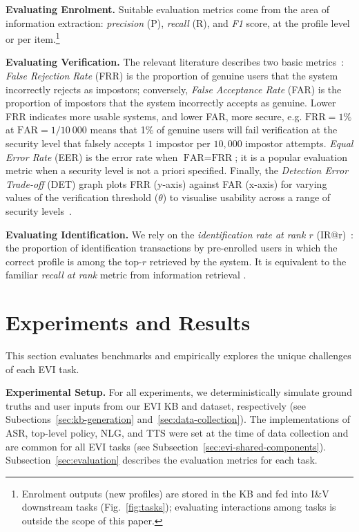 \documentclass[11pt]{article}
\newcommand{\sparagraph}[1]{\noindent\textbf{#1.}}
\newcommand{\rparagraph}[1]{\vspace{1.4mm}\noindent\textbf{#1.}}
\begin{document}
{\sparagraph{Evaluating Enrolment}
Suitable evaluation metrics come from the area of information extraction: \textit{precision} (P), \textit{recall} (R), and \textit{F1} score, at the profile level or per item.\footnote{
Enrolment outputs (new profiles) are stored in the KB and fed into I\&V downstream tasks (Fig.~\ref{fig:tasks});
evaluating interactions among tasks is outside the scope of this paper.}

\rparagraph{Evaluating Verification}
The relevant literature describes two basic metrics~\cite{el2012evaluation}:
\textit{False Rejection Rate} (FRR)
is the proportion of genuine users
that the system incorrectly rejects as impostors;
conversely,
\textit{False Acceptance Rate} (FAR)
is the proportion of impostors
that the system incorrectly accepts as genuine.
Lower FRR indicates more usable systems,
and lower FAR, more secure,
e.g. $\text{FRR}=1\%$ at $\text{FAR}=1/10~000$
means that 1\% of genuine users will fail verification
at the security level
that falsely accepts $1$ impostor per $10,000$ impostor attempts.
\textit{Equal Error Rate} (EER) is the error rate when $\text{FAR}=\text{FRR}$;
it is a popular evaluation metric when a security level is not a priori specified.
Finally, the \textit{Detection Error Trade-off} (DET) graph
plots FRR (y-axis) against FAR (x-axis)
for varying values of the verification threshold ($\theta$)
to visualise usability across a range of security levels~\cite{martin1997det}.


\rparagraph{Evaluating Identification}
We rely on the \textit{identiﬁcation rate at rank $r$} (IR@r)~\cite{el2012evaluation}:
the proportion of identification transactions by pre-enrolled users
in which the correct profile is among the top-$r$ retrieved by the system.
It is equivalent to the familiar \textit{recall at rank} metric from information retrieval \cite{manning2008ir}.



 
\section{Experiments and Results}
\label{sec:experiments}


This section evaluates benchmarks and empirically explores the unique challenges of each EVI task.



\rparagraph{Experimental Setup}
For all experiments,
we deterministically simulate 
ground truths and 
user inputs
from our EVI KB and dataset,
respectively 
(see Subections~\ref{sec:kb-generation} and~\ref{sec:data-collection}).
The implementations of
ASR, top-level policy, NLG, and TTS
were set at the time of data collection
and are common for all EVI tasks (see Subsection~\ref{sec:evi-shared-components}).
Subsection~\ref{sec:evaluation} describes
the evaluation metrics for each task.





}
\end{document}
